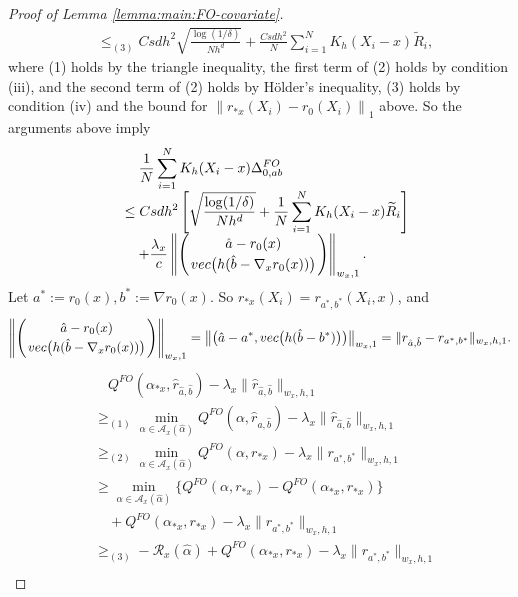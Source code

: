 \documentclass[10pt,a4paper]{amsart}
\begin{document}
\begin{proof}[Proof of Lemma \ref{lemma:main:FO-covariate}]
$$\begin{array}{rl}
&\displaystyle \leq_{(3)} Csdh^2\sqrt{\frac{\log(1/\delta)}{Nh^d}} +  \frac{Csdh^2}{N}\sum_{i=1}^N K_h(X_i-x)\widetilde{R}_i,
\end{array}$$
where (1) holds by the triangle inequality, the first term of (2) holds by condition (iii), and the second term of (2) holds by H\"older's inequality, (3) holds by condition (iv) and the bound for $\left\|  r_{*x}(X_i)-r_0(X_i) \right\|_1$ above. So the arguments above imply
\begin{equation}\label{eq:bound:I:II}
\begin{array}{rl}
    &\quad\displaystyle\frac{1}{N}\sum_{i=1}^N K_h(X_i-x)\Delta_{0,ab}^{FO}\\
    &\displaystyle\leq Csdh^2\left[\sqrt{\frac{\log(1/\delta)}{Nh^d}} +  \frac{1}{N}\sum_{i=1}^N K_h(X_i-x)\widetilde{R}_i\right]\\
    &\displaystyle\quad+\frac{\lambda_x}{c}\left\|\left( {\hat a - r_0(x)}\atop{ {\rm vec}\big(h(\hat b - \nabla_xr_0(x)})\big)\right) \right\|_{w_x,1}.
\end{array}
\end{equation}
Let $a^*:=r_0(x), b^*:=\nabla r_0(x)$. So $r_{*x}(X_i)=r_{a^*,b^*}(X_i,x)$, and 
$$\left\|\left( {\hat a - r_0(x)}\atop{ {\rm vec}\big(h(\hat b - \nabla_xr_0(x)})\big)\right) \right\|_{w_x,1}=\big\|\big(\hat a - a^*,{\rm vec}\big(h(\hat b - b^*)\big)\big)\big\|_{w_x,1}=\|r_{\hat{a},\hat{b}}-r_{a^*,b^*}\|_{w_x,h,1}.$$
\begin{equation}\label{eq:covariate:main:steps}
\begin{array}{rl}
&\quad\displaystyle Q^{FO}(\alpha_{*x},\hat r_{\hat a,\hat b}) - \lambda_x \|\hat r_{\hat a,\hat b}\|_{w_x,h,1}\\
& \geq_{(1)}\displaystyle \min_{\alpha \in \mathcal{A}_x(\hat\alpha)} Q^{FO}(\alpha,\hat r_{\hat a,\hat b}) - \lambda_x \|\hat r_{\hat a,\hat b}\|_{w_x,h,1} \\
& \displaystyle \geq_{(2)} \min_{\alpha \in \mathcal{A}_x(\hat\alpha)} Q^{FO}(\alpha,r_{*x}) - \lambda_x \|r_{a^*,b^*}\|_{w_x,h,1}\\
&\displaystyle \geq \min_{\alpha \in \mathcal{A}_x(\hat\alpha)} \{Q^{FO}(\alpha,r_{*x})-Q^{FO}(\alpha_{*x},r_{*x})\} \\
&\quad + Q^{FO}(\alpha_{*x},r_{*x})- \lambda_x \|r_{a^*,b^*}\|_{w_x,h,1} \\
&\displaystyle  \geq_{(3)}  - \mathcal{R}_x(\hat\alpha) + Q^{FO}(\alpha_{*x},r_{*x})- \lambda_x \|r_{a^*,b^*}\|_{w_x,h,1} \\
\end{array}

\end{equation}
\end{proof}
\end{document}
